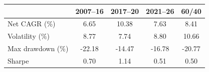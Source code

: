 \begin{tabular}{@{}lS[table-format=-2.2]S[table-format=-2.2]S[table-format=-2.2]S[table-format=-2.2]@{}}
\toprule
 & {2007--16} & {2017--20} & {2021--26} & {60/40} \\
\midrule
Net CAGR (\%) & 6.65 & 10.38 & 7.63 & 8.41 \\
Volatility (\%) & 8.77 & 7.74 & 8.80 & 10.66 \\
Max drawdown (\%) & -22.18 & -14.47 & -16.78 & -20.77 \\
Sharpe & 0.70 & 1.14 & 0.51 & 0.50 \\
\bottomrule
\end{tabular}
